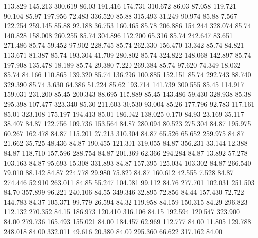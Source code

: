  113.829  145.213  300.619        86.03
 191.416  174.731  310.672        86.03
  87.058  119.721   90.104        85.97
 197.956   72.483  336.520        85.88
 315.493   31.249   90.974        85.88
   7.567  122.254  259.145        85.88
  92.188   36.753  160.465        85.78
 206.886  154.244  328.074        85.74
 140.828  158.008  260.255        85.74
 304.896  172.200   65.316        85.74
 242.647   83.651  271.486        85.74
  59.452   97.902  228.745        85.74
 262.330  156.470   13.342        85.74
  84.821  113.671   81.387        85.74
 193.304   41.709  280.802        85.74
 324.822  148.068  142.897        85.74
 197.908  135.478   18.189        85.74
  29.380    7.220  269.384        85.74
  97.620   74.349   18.032        85.74
  84.166  110.865  139.320        85.74
 136.296  100.885  152.151        85.74
 292.743   88.740  329.390        85.74
   3.630   64.386   51.224        85.62
 193.714  141.739  300.555        85.45
 114.917  159.031  231.200        85.45
 200.343   88.695  115.889        85.45
 143.486   59.430  328.938        85.38
 295.398  107.477  323.340        85.30
 211.603   30.530   93.004        85.26
 177.796   92.783  117.161        85.01
 323.108  175.197  194.413        85.01
 186.042  138.025    0.170        84.93
  23.169   35.117   38.407        84.87
 122.756  109.736  153.564        84.87
 280.094   80.523  275.304        84.87
 195.975   60.267  162.478        84.87
 115.201   27.213  310.304        84.87
  65.526   65.652  259.975        84.87
  21.662   35.725   48.436        84.87
 190.455  121.301  319.055        84.87
 356.231   33.144   12.388        84.87
 118.710  157.596  288.754        84.87
 201.369   62.366  294.284        84.87
  13.892   57.278  103.163        84.87
  95.693   15.308  331.893        84.87
 157.395  125.034  103.302        84.87
 266.540   79.010   88.142        84.87
 224.778   29.980   75.820        84.87
 160.612   42.555    7.528        84.87
 274.446   52.910  263.011        84.85
  55.247  104.081   99.112        84.76
 277.701  102.031  251.503        84.70
 357.899   96.221  240.106        84.55
 349.346   32.895   72.856        84.44
 157.430   72.722  144.783        84.37
 105.371   99.779   26.594        84.32
 119.958   84.159  150.315        84.29
 296.823  112.132  270.352        84.15
 186.973  120.410  316.106        84.15
 192.594  120.547  323.900        84.00
 279.736  165.493  155.021        84.00
 184.457   62.969  112.777        84.00
  11.805  129.788  248.018        84.00
 332.011   49.616   20.380        84.00
 295.360   66.622  317.162        84.00
